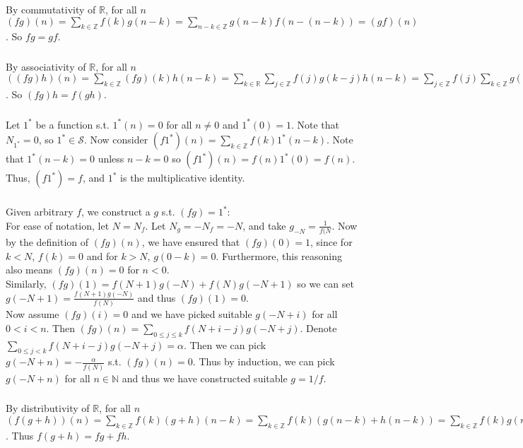 \documentclass{article}
\begin{document}
\subsubsection{}
By commutativity of $\mathbb{R}$, for all $n$ $(fg)(n) = \sum\limits_{k \in \mathbb{Z}} f(k)g(n-k) = \sum\limits_{n-k \in \mathbb{Z}} g(n-k)f(n-(n-k)) = (gf)(n)$. So $fg = gf$.
\subsubsection{}
By associativity of $\mathbb{R}$, for all $n$ $((fg)h)(n) = \sum\limits_{k\in \mathbb{Z}} (fg)(k)h(n-k) = \sum\limits_{k \in \mathbb{R}} \sum\limits_{j \in \mathbb{Z}} f(j)g(k-j)h(n-k) = \sum\limits_{j \in \mathbb{Z}} f(j) \sum\limits_{k \in \mathbb{Z}} g(k-j)\,h(n-j - (k-j)) = (f(gh))(n)$. So $(fg)h = f(gh)$.
\subsubsection{}
Let $1^*$ be a function s.t. $1^*(n) = 0$ for all $n \neq 0$ and $1^*(0) = 1$. Note that $N_{1^*} = 0$, so $1^* \in \mathcal{S}$. Now consider $(f1^*)(n) = \sum\limits_{k \in \mathbb{Z}} f(k)1^*(n-k)$. Note that $1^*(n-k) = 0$ unless $n-k = 0$ so $(f1^*)(n) = f(n)1^*(0) = f(n)$. Thus, $(f1^*) = f$, and $1^*$ is the multiplicative identity.
\subsubsection{}
Given arbitrary $f$, we construct a $g$ s.t. $(fg) = 1^*$:\\
For ease of notation, let $N = N_f$. Let $N_g = -N_f = -N$, and take $g_{-N} = \frac{1}{f(N}$. Now by the definition of $(fg)(n)$, we have ensured that $(fg)(0) = 1$, since for $k<N$, $f(k) = 0$ and for $k>N$, $g(0-k) = 0$. Furthermore, this reasoning also means $(fg)(n) = 0$ for $n<0$.\\
Similarly, $(fg)(1) = f(N+1)g(-N) + f(N)g(-N+1)$ so we can set $g(-N+1) = \frac{f(N+1)g(-N)}{f(N)}$ and thus $(fg)(1) = 0$.\\
Now assume $(fg)(i) = 0$ and we have picked suitable $g(-N+i)$ for all $0<i<n$. Then $(fg)(n) = \sum\limits_{0\leq j \leq k} f(N+i-j)g(-N+j)$. Denote $\sum\limits_{0\leq j < k} f(N+i-j)g(-N+j) = \alpha$. Then we can pick $g(-N+n) = -\frac{\alpha}{f(N)}$ s.t. $(fg)(n) = 0$. Thus by induction, we can pick $g(-N+n)$ for all $n \in \mathbb{N}$ and thus we have constructed suitable $g = 1/f$.
\subsubsection{}
By distributivity of $\mathbb{R}$, for all $n$ $(f(g+h))(n) = \sum\limits_{k \in \mathbb{Z}} f(k)(g+h)(n-k) = \sum\limits_{k \in \mathbb{Z}} f(k)(g(n-k) + h(n-k)) = \sum\limits_{k \in \mathbb{Z}}f(k)g(n-k) + \sum\limits_{k \in \mathbb{Z}}f(k) h(n-k) = (fg)(n) + (fh)(n) = (fg + fh)(n)$. Thus $f(g+h) = fg + fh$.
\end{document}
